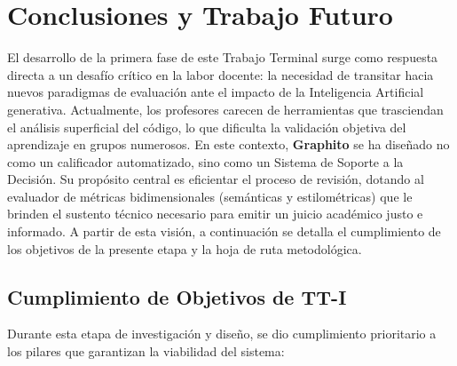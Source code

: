 \chapter{Conclusiones y Trabajo Futuro}
\label{sec:conclusiones}

El desarrollo de la primera fase de este Trabajo Terminal surge como respuesta directa a un desafío crítico en la labor docente: la necesidad de transitar hacia nuevos paradigmas de evaluación ante el impacto de la Inteligencia Artificial generativa. Actualmente, los profesores carecen de herramientas que trasciendan el análisis superficial del código, lo que dificulta la validación objetiva del aprendizaje en grupos numerosos. En este contexto, \textbf{Graphito} se ha diseñado no como un calificador automatizado, sino como un Sistema de Soporte a la Decisión. Su propósito central es eficientar el proceso de revisión, dotando al evaluador de métricas bidimensionales (semánticas y estilométricas) que le brinden el sustento técnico necesario para emitir un juicio académico justo e informado. A partir de esta visión, a continuación se detalla el cumplimiento de los objetivos de la presente etapa y la hoja de ruta metodológica.

\section{Cumplimiento de Objetivos de TT-I}

Durante esta etapa de investigación y diseño, se dio cumplimiento prioritario a los pilares que garantizan la viabilidad del sistema:

